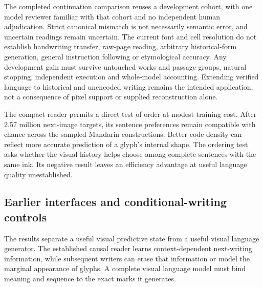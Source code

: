 \documentclass[12pt,a4paper]{article}
\providecommand{\DIFadd}[1]{{\protect\color{blue} \sf #1}} %
\providecommand{\DIFaddend}{} %
\begin{document}
\DIFadd{The completed continuation comparison reuses a development cohort, with one
model reviewer familiar with that cohort and no independent human adjudication.
Strict canonical mismatch is not necessarily semantic error, and uncertain
readings remain uncertain. The current font and cell resolution do not establish
handwriting transfer, raw-page reading, arbitrary historical-form generation,
general instruction following or etymological accuracy. Any development gain
must survive untouched works and passage groups, natural stopping, independent
execution and whole-model accounting. Extending verified language to historical
and unencoded writing remains the intended application, not a consequence of
pixel support or supplied reconstruction alone.
}

\DIFadd{The compact reader permits a direct test of order at modest training cost.
After 2.57 million next-image targets, its sentence preferences remain
compatible with chance across the sampled Mandarin constructions. Better
code density can reflect more accurate prediction of a glyph's internal
shape. The ordering test asks whether the visual history helps choose among
complete sentences with the same ink. Its negative result leaves an efficiency
advantage at useful language quality unestablished.
}


\subsection*{\DIFadd{Earlier interfaces and conditional-writing controls}}
\DIFadd{The }\DIFaddend results separate a useful visual predictive state from a useful visual
language generator. The established causal reader learns context-dependent
next-writing information, while subsequent writers can erase that information
or model the marginal appearance of glyphs. A complete visual language model
must bind meaning and sequence to the exact marks it generates.
\end{document}

